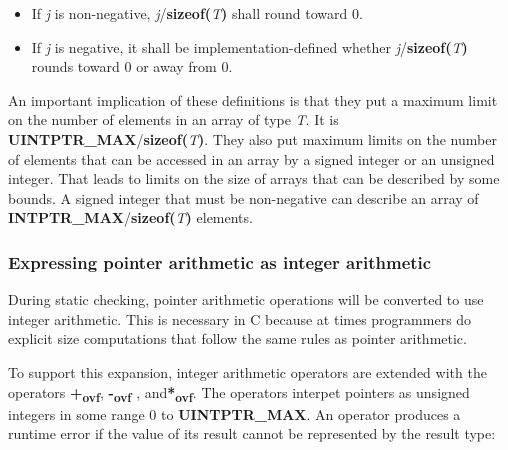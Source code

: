 \documentclass[]{article}
\begin{document}
\begin{itemize}
  \begin{itemize}
  \item
    If \emph{j} is non-negative,
    \emph{j}/\textbf{sizeof(}\emph{T}\textbf{)} shall round toward 0.
  \item
    If \emph{j} is negative, it shall be implementation-defined whether
    \emph{j}/\textbf{sizeof(}\emph{T}\textbf{)} rounds toward 0 or away
    from 0.
  \end{itemize}
\end{itemize}

An important implication of these definitions is that they put a maximum
limit on the number of elements in an array of type \emph{T}. It is
\textbf{UINTPTR\_MAX}/\textbf{sizeof(}\emph{T}\textbf{)}. They also put
maximum limits on the number of elements that can be accessed in an
array by a signed integer or an unsigned integer. That leads to limits
on the size of arrays that can be described by some bounds. A signed
integer that must be non-negative can describe an array of
\textbf{INTPTR\_MAX}/\textbf{sizeof(}\emph{T}\textbf{)} elements.

\subsubsection{\texorpdfstring{\protect\hypertarget{ux5fRef440285094}{}{\protect\hypertarget{ux5fToc440445419}{}{\protect\hypertarget{ux5fToc440449201}{}{\protect\hypertarget{ux5fToc440551851}{}{}}}}Expressing
pointer arithmetic as integer
arithmetic}{Expressing pointer arithmetic as integer arithmetic}}\label{expressing-pointer-arithmetic-as-integer-arithmetic}

During static checking, pointer arithmetic operations will be converted
to use integer arithmetic. This is necessary in C because at times
programmers do explicit size computations that follow the same rules as
pointer arithmetic.

To support this expansion, integer arithmetic operators are extended
with the operators \textbf{+\textsubscript{ovf}},
\textbf{-\textsubscript{ovf}} , and\textbf{*\textsubscript{ovf}}. The
operators interpet pointers as unsigned integers in some range 0 to
\textbf{UINTPTR\_MAX}. An operator produces a runtime error if the value
of its result cannot be represented by the result type:
\end{document}
